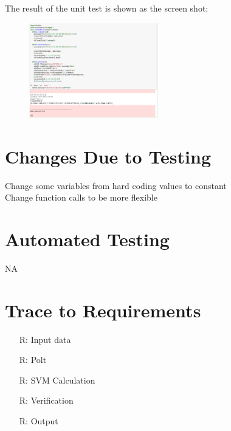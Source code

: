 \documentclass[12pt, titlepage]{article}
\newcounter{reqnum} %
\begin{document}
\begin{enumerate}
The result of the unit test is shown as the screen shot:
~\newline
\begin{figure}[h!]
\begin{center}
{
\includegraphics[width=0.5\textwidth]{unittest.png}
}
\caption{\label{Spark}}
\end{center}
\end{figure}
\end{enumerate} 

\section{Changes Due to Testing}
Change some variables from hard coding values to constant\\
Change function calls to be more flexible \\

\section{Automated Testing}
NA
\section{Trace to Requirements}

\noindent \begin{itemize}

\item[R\refstepcounter{reqnum}\thereqnum \label{R_Inputs}:] Input data 

\item[R\refstepcounter{reqnum}\thereqnum \label{R_OutputInputs}:] Polt

\item[R\refstepcounter{reqnum}\thereqnum \label{R_Calculate}:] SVM Calculation

\item[R\refstepcounter{reqnum}\thereqnum \label{R_VerifyOutput}:] Verification

\item[R\refstepcounter{reqnum}\thereqnum \label{R_Output}:] Output
\end{itemize}
\end{document}
